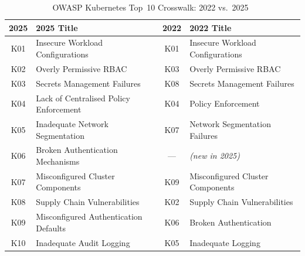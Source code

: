 \begin{table}[ht]
\centering
\caption{OWASP Kubernetes Top~10 Crosswalk: 2022 vs.\ 2025~\cite{owasp-k8s-2025,owasp-k8s-2022}}
\label{tab:owasp-crosswalk}
\begin{tabular}{@{}clcl@{}}
\toprule
\textbf{2025} & \textbf{2025 Title} & \textbf{2022} & \textbf{2022 Title} \\
\midrule
K01 & Insecure Workload Configurations      & K01  & Insecure Workload Configurations \\
K02 & Overly Permissive RBAC                & K03  & Overly Permissive RBAC \\
K03 & Secrets Management Failures           & K08  & Secrets Management Failures \\
K04 & Lack of Centralised Policy Enforcement & K04  & Policy Enforcement \\
K05 & Inadequate Network Segmentation       & K07  & Network Segmentation Failures \\
K06 & Broken Authentication Mechanisms      & ---  & \textit{(new in 2025)} \\
K07 & Misconfigured Cluster Components      & K09  & Misconfigured Cluster Components \\
K08 & Supply Chain Vulnerabilities          & K02  & Supply Chain Vulnerabilities \\
K09 & Misconfigured Authentication Defaults & K06  & Broken Authentication \\
K10 & Inadequate Audit Logging              & K05  & Inadequate Logging \\
\bottomrule
\end{tabular}
\end{table}